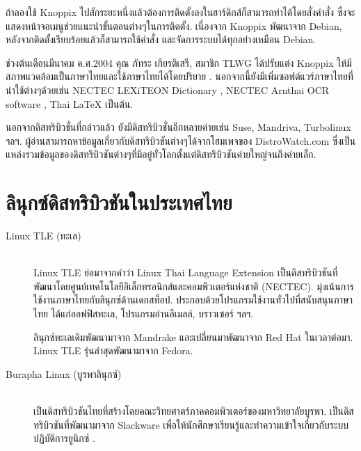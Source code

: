 \begin{thwbr}
{{ถ้าลองใช้ Knoppix ไปสักระยะหนึ่งแล้วต้องการติดตั้งลงในฮาร์ดิกส์ก็สามารถทำได้โดยสั่งคำสั่ง  ซึ่งจะแสดงหน้าจอเมนูช่วยแนะนำขั้นตอนต่างๆในการติดตั้ง. เนื่องจาก Knoppix พัฒนาจาก Debian, หลังจากติดตั้งเรียบร้อยแล้วก็สามารถใช้คำสั่ง  และจัดการระบบได้ทุกอย่างเหมือน Debian.

ช่วงต้นเดือนมีนาคม ค.ศ.2004 คุณ ภัทระ เกียรติเสรี, สมาชิก TLWG ได้ปรับแต่ง Knoppix ให้มีสภาพแวดล้อมเป็นภาษาไทยและใช้ภาษาไทยได้โดยปริยาย \cite{knoppix-th}. นอกจากนี้ยังมีเพิ่มซอฟต์แวร์ภาษาไทยที่น่าใช้ต่างๆด้วยเช่น NECTEC LEXiTEON Dictionary \cite{lexitron}, NECTEC Arnthai OCR software \cite{arnthai}, Thai \LaTeX{} เป็นต้น.


\bigskip
นอกจากดิสทริบิวชั่นที่กล่าวแล้ว ยังมีดิสทริบิวชั่นอีกหลายค่ายเช่น  Suse, Mandriva, Turbolinux ฯลฯ. ผู้อ่านสามารถหาข้อมูลเกี่ยวกับดิสทริบิวชันต่างๆได้จากโฮมเพจของ DistroWatch.com \cite{distrowatch} ซึ่งเป็นแหล่งรวมข้อมูลของดิสทริบิวชันต่างๆที่มีอยู่ทั่วโลกตั้งแต่ดิสทริบิวชันค่ายใหญ่จนถึงค่ายเล็ก.



\section{ลินุกซ์ดิสทริบิวชันในประเทศไทย}
\begin{description}
\item[Linux TLE (ทะเล)]\mbox{}\\
Linux TLE ย่อมาจากคำว่า Linux Thai Language Extension \cite{opentle} เป็นดิสทริบิวชันที่พัฒนาโดยศูนย์เทคโนโลยีอิเล็กทรอนิกส์และคอมพิวเตอร์แห่งชาติ (NECTEC). มุ่งเน้นการใช้งานภาษาไทยกับลินุกซ์ด้านเดกสท็อป. ประกอบด้วยโปรแกรมใช้งานทั่วไปที่สนับสนุนภาษาไทย ได้แก่ออฟฟิสทะเล, โปรแกรมอ่านอีเมลล์, บราวเซอร์ ฯลฯ. 

ลินุกซ์ทะเลเดิมพัฒนามาจาก Mandrake และเปลี่ยนมาพัฒนาจาก Red Hat ในเวลาต่อมา. Linux TLE รุ่นล่าสุดพัฒนามาจาก Fedora.
\item[Burapha Linux (บูรพาลินุกซ์)]\mbox{}\\
เป็นดิสทริบิวชันไทยที่สร้างโดยคณะวิทยศาตร์ภาคคอมพิวเตอร์ของมหาวิทยาลัยบูรพา. เป็นดิสทริบิวชันที่พัฒนามาจาก Slackware เพื่อให้นักศึกษาเรียนรู้และทำความเข้าใจเกี่ยวกับระบบปฏิบัติการยูนิกซ์ \cite{burapha}. 
\end{description}

}}
\end{thwbr}
